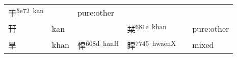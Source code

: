 \documentclass[14pt,a4paper]{scrartcl}
\begin{document}
\begin{longtable}[c]{@{}llllll@{}}
\begin{minipage}[t]{0.14\columnwidth}\raggedright\strut
干\textsuperscript{5e72~kan}
\strut\end{minipage} &
\begin{minipage}[t]{0.14\columnwidth}\raggedright\strut
\strut\end{minipage} &
\begin{minipage}[t]{0.14\columnwidth}\raggedright\strut
pure:other
\strut\end{minipage}\tabularnewline
\begin{minipage}[t]{0.14\columnwidth}\raggedright\strut
幵
\strut\end{minipage} &
\begin{minipage}[t]{0.14\columnwidth}\raggedright\strut
kan
\strut\end{minipage} &
\begin{minipage}[t]{0.14\columnwidth}\raggedright\strut
\strut\end{minipage} &
\begin{minipage}[t]{0.14\columnwidth}\raggedright\strut
栞\textsuperscript{681e~khan}
\strut\end{minipage} &
\begin{minipage}[t]{0.14\columnwidth}\raggedright\strut
\strut\end{minipage} &
\begin{minipage}[t]{0.14\columnwidth}\raggedright\strut
pure:other
\strut\end{minipage}\tabularnewline
\begin{minipage}[t]{0.14\columnwidth}\raggedright\strut
旱
\strut\end{minipage} &
\begin{minipage}[t]{0.14\columnwidth}\raggedright\strut
khan
\strut\end{minipage} &
\begin{minipage}[t]{0.14\columnwidth}\raggedright\strut
悍\textsuperscript{608d~hanH}
\strut\end{minipage} &
\begin{minipage}[t]{0.14\columnwidth}\raggedright\strut
睅\textsuperscript{7745~hwaenX}
\strut\end{minipage} &
\begin{minipage}[t]{0.14\columnwidth}\raggedright\strut
\strut\end{minipage} &
\begin{minipage}[t]{0.14\columnwidth}\raggedright\strut
mixed
\strut\end{minipage}\tabularnewline
\bottomrule
\end{longtable}
\end{document}
